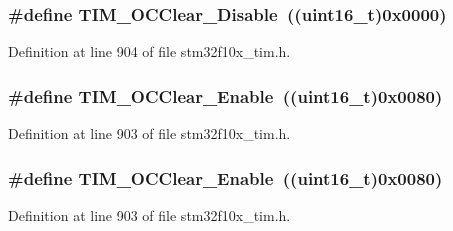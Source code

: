 \subsubsection[{\texorpdfstring{T\+I\+M\+\_\+\+O\+C\+Clear\+\_\+\+Disable}{TIM_OCClear_Disable}}]{\setlength{\rightskip}{0pt plus 5cm}\#define T\+I\+M\+\_\+\+O\+C\+Clear\+\_\+\+Disable~(({\bf uint16\+\_\+t})0x0000)}\hypertarget{group___t_i_m___output___compare___clear___state_gadb09946cb5dded7520baf4b19173204d}{}\label{group___t_i_m___output___compare___clear___state_gadb09946cb5dded7520baf4b19173204d}


Definition at line 904 of file stm32f10x\+\_\+tim.\+h.

\subsubsection[{\texorpdfstring{T\+I\+M\+\_\+\+O\+C\+Clear\+\_\+\+Enable}{TIM_OCClear_Enable}}]{\setlength{\rightskip}{0pt plus 5cm}\#define T\+I\+M\+\_\+\+O\+C\+Clear\+\_\+\+Enable~(({\bf uint16\+\_\+t})0x0080)}\hypertarget{group___t_i_m___output___compare___clear___state_ga1b7bce48b3e1478aad98c95fbbe7a6e0}{}\label{group___t_i_m___output___compare___clear___state_ga1b7bce48b3e1478aad98c95fbbe7a6e0}


Definition at line 903 of file stm32f10x\+\_\+tim.\+h.

\subsubsection[{\texorpdfstring{T\+I\+M\+\_\+\+O\+C\+Clear\+\_\+\+Enable}{TIM_OCClear_Enable}}]{\setlength{\rightskip}{0pt plus 5cm}\#define T\+I\+M\+\_\+\+O\+C\+Clear\+\_\+\+Enable~(({\bf uint16\+\_\+t})0x0080)}\hypertarget{group___t_i_m___output___compare___clear___state_ga1b7bce48b3e1478aad98c95fbbe7a6e0}{}\label{group___t_i_m___output___compare___clear___state_ga1b7bce48b3e1478aad98c95fbbe7a6e0}


Definition at line 903 of file stm32f10x\+\_\+tim.\+h.

